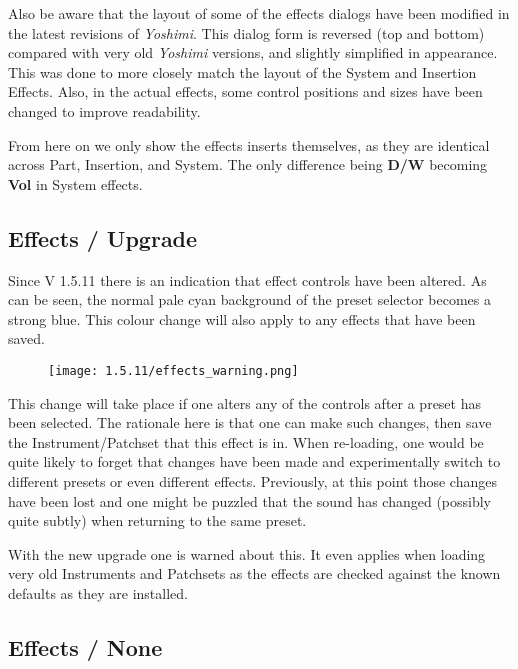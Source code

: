   Also be aware that the layout of some of the effects dialogs have been modified
   in the latest revisions of \textsl{Yoshimi}.
   This dialog form is reversed (top and bottom) compared with very old
   \textsl{Yoshimi} versions, and slightly simplified in appearance. This was done to
   more closely match the layout of the System and Insertion Effects.
   Also, in the actual effects, some control positions and sizes have been changed
   to improve readability.

   From here on we only show the effects inserts themselves, as they are identical
   across Part, Insertion, and System. The only difference being \textbf{D/W} becoming
   \textbf{Vol} in System effects.

\subsection{Effects / Upgrade}
\label{subsec:effects_upgrade}
   Since V 1.5.11 there is an indication that effect controls have been altered. As can
   be seen, the normal pale cyan background of the preset selector becomes a strong blue.
   This colour change will also apply to any effects that have been saved.
   \begin{figure}[H]
   \centering
   \texttt{[image: 1.5.11/effects\_warning.png]}
   \label{fig:effects_warning}
\end{figure}

   This change will take place if one alters any of the controls after a preset has been
   selected. The rationale here is that one can make such changes, then save the
   Instrument/Patchset that this effect is in.
   When re-loading, one would be quite likely to forget that changes have been made and
   experimentally switch to different presets or even different effects.
   Previously, at this point those changes have been lost and one might be puzzled that
   the sound has changed (possibly quite subtly) when returning to the same preset.

   With the new upgrade one is warned about this. It even applies when loading very old
   Instruments and Patchsets as the effects are checked against the known defaults as
   they are installed.

\subsection{Effects / None}
\label{subsec:effects_edit_none}

